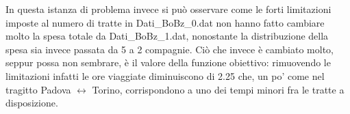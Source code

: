 \documentclass[main.tex]{subfiles}
\begin{document}
In questa istanza di problema invece si può osservare come le forti limitazioni imposte al numero di tratte in Dati\_BoBz\_0.dat non hanno fatto
cambiare molto la spesa totale da Dati\_BoBz\_1.dat, nonostante la distribuzione della spesa sia invece passata da 5 a 2 compagnie. Ciò che invece è cambiato
molto, seppur possa non sembrare, è il valore della funzione obiettivo: rimuovendo le limitazioni infatti le ore viaggiate diminuiscono di 2.25 che, un po' come 
nel tragitto Padova $\leftrightarrow$ Torino, corrispondono a uno dei tempi minori fra le tratte a disposizione.
\end{document}
